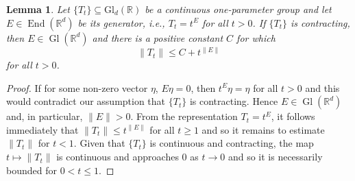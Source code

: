 \documentclass[11pt]{article}
\newtheorem{lemma}[theorem]{Lemma}
\newcommand\End{\operatorname{End}} %
\newcommand\GldR{\mbox{Gl}_d(\mathbb{R})}%
\newcommand\Gl{\operatorname{Gl}} %
\begin{document}
\begin{lemma}\label{lem:OperatorBoundsforContractingGroup}
Let $\{T_t\}\subseteq\GldR$ be a continuous one-parameter group and let $E\in\End(\mathbb{R}^d)$ be its generator, i.e., $T_t=t^E$ for all $t>0$.
If $\{T_t\}$ is contracting, then $E\in\Gl(\mathbb{R}^d)$ and there is a positive constant $C$ for which
\begin{equation*}
\|T_t\|\leq C+t^{\|E\|}
\end{equation*}
for all $t>0$.
\end{lemma}
\begin{proof}
If for some non-zero vector $\eta$, $E\eta=0$, then $t^E\eta=\eta$ for all $t>0$ and this would contradict our assumption that $\{T_t\}$ is contracting. Hence $E\in\Gl(\mathbb{R}^d)$ and, in particular, $\|E\|>0$. From the representation $T_t=t^E$, it follows immediately that $\|T_t\|\leq t^{\|E\|}$ for all $t\geq 1$ and so it remains to estimate $\|T_t\|$ for $t<1$. Given that $\{T_t\}$ is continuous and contracting, the map $t\mapsto \|T_t\|$ is continuous and approaches $0$ as $t\rightarrow 0$ and so it is necessarily bounded for $0<t\leq 1$.
\end{proof}
\end{document}
